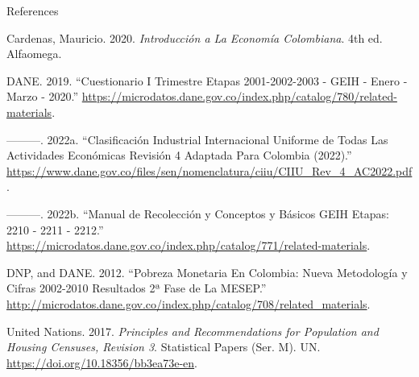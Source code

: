 \documentclass[
  ignorenonframetext,
]{beamer}
\newlength{\cslhangindent}
\newenvironment{CSLReferences}[2] %
 {\begin{list}{}{%
  \setlength{\itemindent}{0pt}
  \setlength{\leftmargin}{0pt}
  \setlength{\parsep}{0pt}
  \ifodd #1
   \setlength{\leftmargin}{\cslhangindent}
   \setlength{\itemindent}{-1\cslhangindent}
  \fi
  \setlength{\itemsep}{#2\baselineskip}}}
 {\end{list}}
\begin{document}
\begin{frame}[allowframebreaks]{References}
\label{refs}
\begin{CSLReferences}{1}{0}
Cardenas, Mauricio. 2020. \emph{Introducción a La {Economía}
{Colombiana}}. 4th ed. Alfaomega.

DANE. 2019. {``Cuestionario {I} {Trimestre} {Etapas} 2001-2002-2003 -
{GEIH} - {Enero} - {Marzo} - 2020.''}
\url{https://microdatos.dane.gov.co/index.php/catalog/780/related-materials}.

---------. 2022a. {``Clasificación {Industrial} {Internacional}
{Uniforme} de Todas Las Actividades Económicas {Revisión} 4 {Adaptada}
Para {Colombia} (2022).''}
\url{https://www.dane.gov.co/files/sen/nomenclatura/ciiu/CIIU_Rev_4_AC2022.pdf}.

---------. 2022b. {``Manual de Recolección y Conceptos y Básicos {GEIH}
{Etapas}: 2210 - 2211 - 2212.''}
\url{https://microdatos.dane.gov.co/index.php/catalog/771/related-materials}.

DNP, and DANE. 2012. {``Pobreza Monetaria En Colombia: Nueva Metodología
y Cifras 2002-2010 Resultados 2ª {Fase} de La {MESEP}.''}
\url{http://microdatos.dane.gov.co/index.php/catalog/708/related_materials}.

United Nations. 2017. \emph{Principles and {Recommendations} for
{Population} and {Housing} {Censuses}, {Revision} 3}. Statistical
{Papers} ({Ser}. {M}). UN. \url{https://doi.org/10.18356/bb3ea73e-en}.

\end{CSLReferences}
\end{frame}
\end{document}
